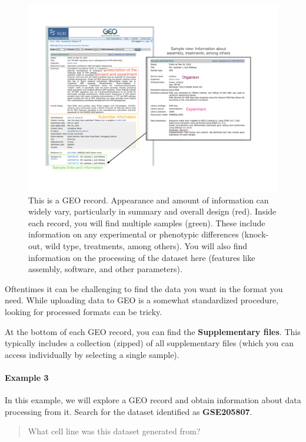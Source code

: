 \documentclass[
]{book}
\begin{document}
\begin{figure}
\centering
\includegraphics{figures/GEOrecord.png}
\caption{This is a GEO record. Appearance and amount of information can widely vary, particularly in summary and overall design (red). Inside each record, you will find multiple samples (green). These include information on any experimental or phenotypic differences (knock-out, wild type, treatments, among others). You will also find information on the processing of the dataset here (features like assembly, software, and other parameters).}
\end{figure}

Oftentimes it can be challenging to find the data you want in the format you need. While uploading data to GEO is a somewhat standardized procedure, looking for processed formats can be tricky.

At the bottom of each GEO record, you can find the \textbf{Supplementary files}. This typically includes a collection (zipped) of all supplementary files (which you can access individually by selecting a single sample).

\hypertarget{example-3}{%
\paragraph{Example 3}\label{example-3}}

In this example, we will explore a GEO record and obtain information about data processing from it.
Search for the dataset identified as \textbf{GSE205807}.

\begin{quote}
What cell line was this dataset generated from?
\end{quote}
\end{document}
